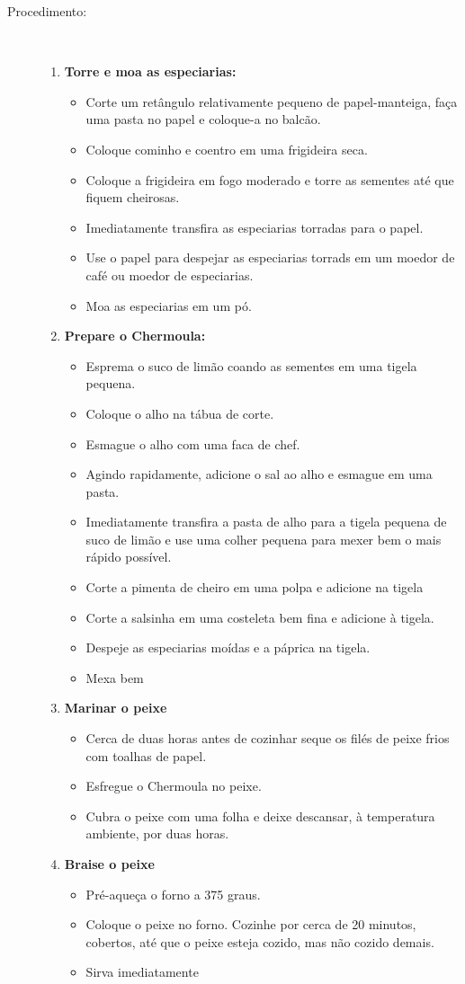 \documentclass [11pt, papel de carta] {article}
\begin{document}
\begin {description}
\item [Procedimento:] \ \\
\begin {enumerate}
\item {\bf Torre e moa as especiarias:}
\begin {itemize}
\item Corte um retângulo relativamente pequeno de papel-manteiga, faça uma pasta no papel e coloque-a no balcão.
\item Coloque cominho e coentro em uma frigideira seca.
\item Coloque a frigideira em fogo moderado e torre as sementes até que fiquem cheirosas.
\item Imediatamente transfira as especiarias torradas para o papel.
\item Use o papel para despejar as especiarias torrads em um moedor de café ou moedor de especiarias.
\item Moa as especiarias em um pó.
\end {itemize}
\item {\bf Prepare o Chermoula:}
\begin {itemize}
\item Esprema o suco de limão coando as sementes em uma tigela pequena.
\item Coloque o alho na tábua de corte.
\item Esmague o alho com uma faca de chef.
\item Agindo rapidamente, adicione o sal ao alho e esmague em uma pasta.
\item Imediatamente transfira a pasta de alho para a tigela pequena de suco de limão e use uma colher pequena para mexer bem o mais rápido possível.
\item Corte a pimenta de cheiro em uma polpa e adicione na tigela
\item Corte a salsinha em uma costeleta bem fina e adicione à tigela.
\item Despeje as especiarias moídas e a páprica na tigela.
\item Mexa bem
\end {itemize}
\item {\bf Marinar o peixe}
\begin {itemize}
\item Cerca de duas horas antes de cozinhar seque os filés de peixe frios com toalhas de papel.
\item Esfregue o Chermoula no peixe.
\item Cubra o peixe com uma folha e deixe descansar, à temperatura ambiente, por duas horas.
\end {itemize}
\item {\bf Braise o peixe}
\begin {itemize}
\item Pré-aqueça o forno a 375 graus.
\item Coloque o peixe no forno.
Cozinhe por cerca de 20 minutos, cobertos, até que o peixe esteja cozido, mas não cozido demais.
\item Sirva imediatamente
\end {itemize}
\end {enumerate}
\end {description}
\end{document}
